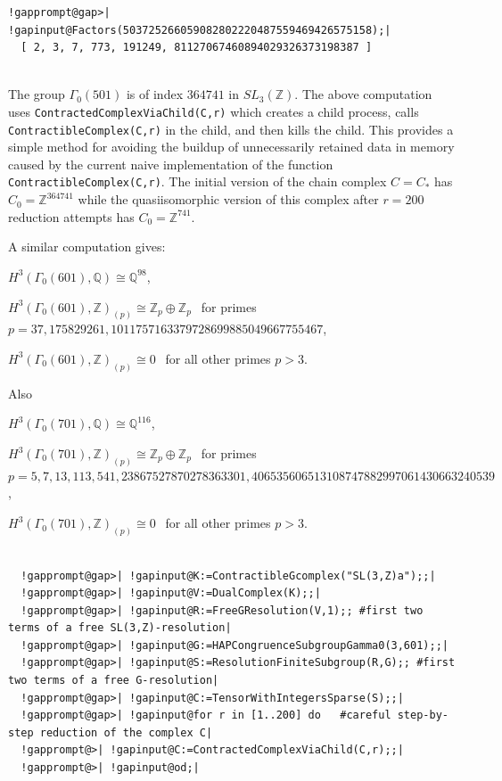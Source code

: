 \documentclass[a4paper,11pt]{report}
\begin{document}
{{{\begin{Verbatim}[commandchars=!@|,fontsize=\small,frame=single,label=Example]
  !gapprompt@gap>| !gapinput@Factors(503725266059082802220487559469426575158);|
  [ 2, 3, 7, 773, 191249, 81127067460894029326373198387 ]
  
\end{Verbatim}
 The group $\Gamma_0(501)$ is of index $364741$ in $SL_3(\mathbb Z)$. The above computation uses \texttt{ContractedComplexViaChild(C,r)} which creates a child process, calls \texttt{ContractibleComplex(C,r)} in the child, and then kills the child. This provides a simple method for
avoiding the build\texttt{}up of unnecessarily retained data in
memory caused by the current naive implementation of the function \texttt{ContractibleComplex(C,r)}. The initial version of the chain complex $C=C_\ast$ has $C_0=\mathbb Z^{364741}$ while the quasi\texttt{}isomorphic version of this complex after $r=200$ reduction attempts has $C_0=\mathbb Z^{741}$. 

 A similar computation gives: 

$H^3(\Gamma_0(601),\mathbb Q) \cong \mathbb Q^{98}$, 

$H^3(\Gamma_0(601),\mathbb Z)_{(p)} \cong \mathbb Z_p \oplus \mathbb Z_p \ \ $ for primes $p=37, 175829261, 1011757163379728699885049667755467$, 

$H^3(\Gamma_0(601),\mathbb Z)_{(p)} \cong 0 \ \ $ for all other primes $p> 3$. 

Also 

$H^3(\Gamma_0(701),\mathbb Q) \cong \mathbb Q^{116}$, 

$H^3(\Gamma_0(701),\mathbb Z)_{(p)} \cong \mathbb Z_p \oplus \mathbb Z_p \ \ $ for primes $p= 5, 7, 13, 113, 541, 23867527870278363301,
406535606513108747882997061430663240539$, 

$H^3(\Gamma_0(701),\mathbb Z)_{(p)} \cong 0 \ \ $ for all other primes $p> 3$. 
\begin{Verbatim}[commandchars=!@|,fontsize=\small,frame=single,label=Example]
          
  !gapprompt@gap>| !gapinput@K:=ContractibleGcomplex("SL(3,Z)a");;|
  !gapprompt@gap>| !gapinput@V:=DualComplex(K);;|
  !gapprompt@gap>| !gapinput@R:=FreeGResolution(V,1);; #first two terms of a free SL(3,Z)-resolution|
  !gapprompt@gap>| !gapinput@G:=HAPCongruenceSubgroupGamma0(3,601);;|
  !gapprompt@gap>| !gapinput@S:=ResolutionFiniteSubgroup(R,G);; #first two terms of a free G-resolution|
  !gapprompt@gap>| !gapinput@C:=TensorWithIntegersSparse(S);;|
  !gapprompt@gap>| !gapinput@for r in [1..200] do   #careful step-by-step reduction of the complex C|
  !gapprompt@>| !gapinput@C:=ContractedComplexViaChild(C,r);;|
  !gapprompt@>| !gapinput@od;|
  

\end{Verbatim}}}}
\end{document}
